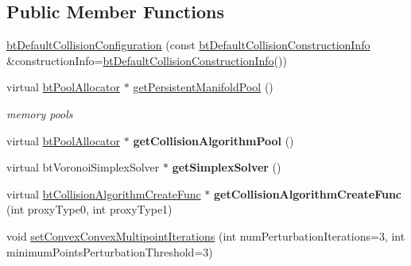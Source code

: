 \subsection*{Public Member Functions}
\begin{DoxyCompactItemize}
\item 
\hyperlink{classbtDefaultCollisionConfiguration_ad08e7d72b0bd0d3f98290c2a1649b0d9}{bt\+Default\+Collision\+Configuration} (const \hyperlink{structbtDefaultCollisionConstructionInfo}{bt\+Default\+Collision\+Construction\+Info} \&construction\+Info=\hyperlink{structbtDefaultCollisionConstructionInfo}{bt\+Default\+Collision\+Construction\+Info}())
\item 
\mbox{\label{classbtDefaultCollisionConfiguration_a5c11b78fe16465a5f6ea4e61af10265b}} 
virtual \hyperlink{classbtPoolAllocator}{bt\+Pool\+Allocator} $\ast$ \hyperlink{classbtDefaultCollisionConfiguration_a5c11b78fe16465a5f6ea4e61af10265b}{get\+Persistent\+Manifold\+Pool} ()
\begin{DoxyCompactList}\small\item\em memory pools \end{DoxyCompactList}\item 
\mbox{\label{classbtDefaultCollisionConfiguration_a4421def5c3353a85b1eec2761a240d66}} 
virtual \hyperlink{classbtPoolAllocator}{bt\+Pool\+Allocator} $\ast$ {\bfseries get\+Collision\+Algorithm\+Pool} ()
\item 
\mbox{\label{classbtDefaultCollisionConfiguration_a2c4d92c742d3bf6d4aac9262dbf772cb}} 
virtual bt\+Voronoi\+Simplex\+Solver $\ast$ {\bfseries get\+Simplex\+Solver} ()
\item 
\mbox{\label{classbtDefaultCollisionConfiguration_ab26c0585e5502e5b82b630056caf31c9}} 
virtual \hyperlink{structbtCollisionAlgorithmCreateFunc}{bt\+Collision\+Algorithm\+Create\+Func} $\ast$ {\bfseries get\+Collision\+Algorithm\+Create\+Func} (int proxy\+Type0, int proxy\+Type1)
\item 
void \hyperlink{classbtDefaultCollisionConfiguration_a39a173eedf0e8d55dd89ef3b637925a9}{set\+Convex\+Convex\+Multipoint\+Iterations} (int num\+Perturbation\+Iterations=3, int minimum\+Points\+Perturbation\+Threshold=3)
\item 

\end{DoxyCompactItemize}
